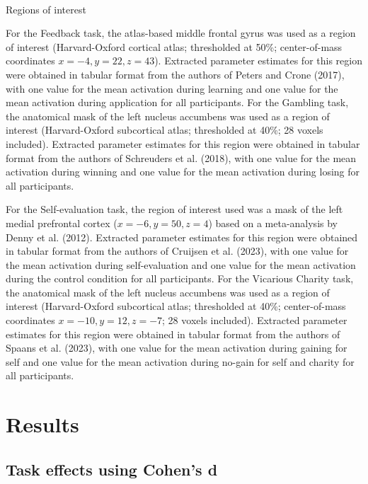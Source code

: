 \documentclass[
  letterpaper,
  DIV=11,
  numbers=noendperiod]{scrartcl}
\makeatletter
\let\oldparagraph\paragraph
\renewcommand{\paragraph}{
    \@ifstar
      \xxxParagraphStar
      \xxxParagraphNoStar
  }
\newcommand{\xxxParagraphStar}[1]{\oldparagraph*{#1}\mbox{}}
\newcommand{\xxxParagraphNoStar}[1]{\oldparagraph{#1}\mbox{}}
\makeatother
\begin{document}
\paragraph{Regions of interest}\label{regions-of-interest}

For the Feedback task, the atlas-based middle frontal gyrus was used as
a region of interest (Harvard-Oxford cortical atlas; thresholded at
50\%; center-of-mass coordinates \(x = -4, y = 22, z = 43\)). Extracted
parameter estimates for this region were obtained in tabular format from
the authors of Peters and Crone (2017), with one value for the mean
activation during learning and one value for the mean activation during
application for all participants. For the Gambling task, the anatomical
mask of the left nucleus accumbens was used as a region of interest
(Harvard-Oxford subcortical atlas; thresholded at 40\%; 28 voxels
included). Extracted parameter estimates for this region were obtained
in tabular format from the authors of Schreuders et al. (2018), with one
value for the mean activation during winning and one value for the mean
activation during losing for all participants.

For the Self-evaluation task, the region of interest used was a mask of
the left medial prefrontal cortex (\(x = −6, y = 50, z = 4\)) based on a
meta-analysis by Denny et al. (2012). Extracted parameter estimates for
this region were obtained in tabular format from the authors of Cruijsen
et al. (2023), with one value for the mean activation during
self-evaluation and one value for the mean activation during the control
condition for all participants. For the Vicarious Charity task, the
anatomical mask of the left nucleus accumbens was used as a region of
interest (Harvard-Oxford subcortical atlas; thresholded at 40\%;
center-of-mass coordinates \(x = −10, y = 12, z = −7\); 28 voxels
included). Extracted parameter estimates for this region were obtained
in tabular format from the authors of Spaans et al. (2023), with one
value for the mean activation during gaining for self and one value for
the mean activation during no-gain for self and charity for all
participants.

\section{Results}\label{results}

\subsection{Task effects using Cohen's
d}\label{task-effects-using-cohens-d}
\end{document}
